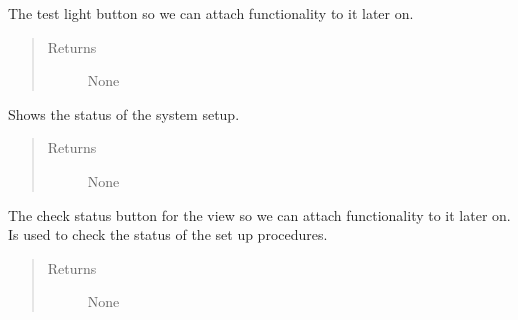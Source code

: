 \documentclass[letterpaper,10pt,english]{sphinxmanual}
\begin{document}
\begin{fulllineitems}
\begin{fulllineitems}
\begin{quote}
\begin{description}
\end{description}\end{quote}

\end{fulllineitems}


\begin{fulllineitems}
\label{\detokenize{index:src.Views.View_VerifySetupScreen.VerifySetupWindow.BtnTestLight}}
The test light button so we can attach functionality to it later on.
\begin{quote}\begin{description}
\item[{Returns}] \leavevmode
None

\end{description}\end{quote}

\end{fulllineitems}


\begin{fulllineitems}
\label{\detokenize{index:src.Views.View_VerifySetupScreen.VerifySetupWindow.checkStatus}}
Shows the status of the system setup.
\begin{quote}\begin{description}
\item[{Returns}] \leavevmode
None

\end{description}\end{quote}

\end{fulllineitems}


\begin{fulllineitems}
\label{\detokenize{index:src.Views.View_VerifySetupScreen.VerifySetupWindow.del_BtnCheck}}
The check status button for the view so we can attach functionality to it later on.
Is used to check the status of the set up procedures.
\begin{quote}\begin{description}
\item[{Returns}] \leavevmode
None


\end{description}
\end{quote}
\end{fulllineitems}
\end{fulllineitems}
\end{document}
